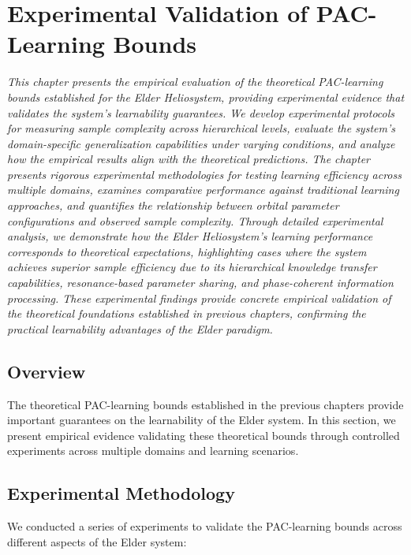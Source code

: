 \chapter{Experimental Validation of PAC-Learning Bounds}

\textit{This chapter presents the empirical evaluation of the theoretical PAC-learning bounds established for the Elder Heliosystem, providing experimental evidence that validates the system's learnability guarantees. We develop experimental protocols for measuring sample complexity across hierarchical levels, evaluate the system's domain-specific generalization capabilities under varying conditions, and analyze how the empirical results align with the theoretical predictions. The chapter presents rigorous experimental methodologies for testing learning efficiency across multiple domains, examines comparative performance against traditional learning approaches, and quantifies the relationship between orbital parameter configurations and observed sample complexity. Through detailed experimental analysis, we demonstrate how the Elder Heliosystem's learning performance corresponds to theoretical expectations, highlighting cases where the system achieves superior sample efficiency due to its hierarchical knowledge transfer capabilities, resonance-based parameter sharing, and phase-coherent information processing. These experimental findings provide concrete empirical validation of the theoretical foundations established in previous chapters, confirming the practical learnability advantages of the Elder paradigm.}

\section{Overview}

The theoretical PAC-learning bounds established in the previous chapters provide important guarantees on the learnability of the Elder system. In this section, we present empirical evidence validating these theoretical bounds through controlled experiments across multiple domains and learning scenarios.



\section{Experimental Methodology}

We conducted a series of experiments to validate the PAC-learning bounds across different aspects of the Elder system:

